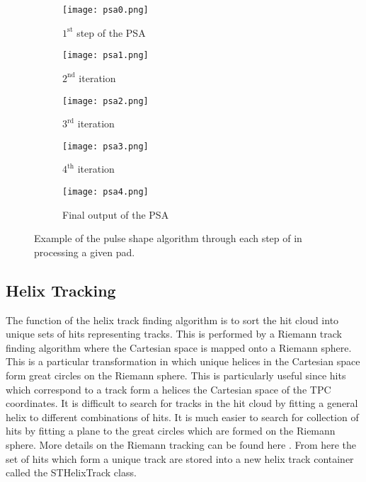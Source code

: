 \begin{figure}[!htb]
     \centering
     \begin{subfigure}[b]{0.24\textwidth}
         \centering
         \texttt{[image: psa0.png]}
         \caption{$\mathrm{1^{st}}$ step of the PSA}
         \label{fig:psa0}
     \end{subfigure}
     \hfill
     \centering
     \begin{subfigure}[b]{0.24\textwidth}
         \centering
         \texttt{[image: psa1.png]}
         \caption{$\mathrm{2^{nd}}$ iteration}
         \label{fig:psa1}
     \end{subfigure}
     \hfill
      \centering
     \begin{subfigure}[b]{0.24\textwidth}
         \centering
         \texttt{[image: psa2.png]}
         \caption{$\mathrm{3^{rd}}$ iteration}
         \label{fig:psa2}
     \end{subfigure}
     \hfill
      \centering
     \begin{subfigure}[b]{0.24\textwidth}
         \centering
         \texttt{[image: psa3.png]}
         \caption{$\mathrm{4^{th}}$ iteration}
         \label{fig:psa3}
     \end{subfigure}
     \hfill
     \centering
     \begin{subfigure}[b]{.5\textwidth}
         \centering
         \texttt{[image: psa4.png]}
         \caption{Final output of the PSA}
         \label{fig:psa4}
     \end{subfigure}
     \hfill
    
\caption{Example of the pulse shape algorithm through each step of in processing a given pad. }
\label{fig:psaTask}
\end{figure}


\subsection{Helix Tracking}
\label{sec:helixtrack}

 The function of the  helix track finding algorithm is to sort the hit cloud into unique sets of hits representing tracks. This is performed by a Riemann track finding algorithm where the Cartesian space is mapped onto a Riemann sphere. This is a particular transformation in which unique helices in the Cartesian space form great circles on the Riemann sphere. This is particularly useful since hits which correspond to a track form a helices the Cartesian space of the TPC coordinates. It is difficult to search for tracks in the hit cloud by fitting a general helix to different combinations of hits. It is much easier to search for collection of hits by fitting a plane to the great circles which are formed on the Riemann sphere. More details on the Riemann tracking can be found here \cite{spiritroot_paper}. From here the set of hits which form a unique track are stored into a new helix track container called the STHelixTrack class. 
 

